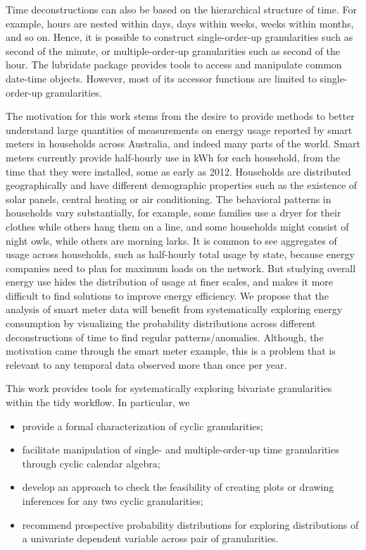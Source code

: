\documentclass[12pt]{article}
\providecommand{\tightlist}{%
  \setlength{\itemsep}{0pt}\setlength{\parskip}{0pt}}
\begin{document}
Time deconstructions can also be based on the hierarchical structure of time. For example, hours are nested within days, days within weeks, weeks within months, and so on. Hence, it is possible to construct single-order-up granularities such as second of the minute, or multiple-order-up granularities such as second of the hour. The lubridate package \citep{Grolemund2011-vm} provides tools to access and manipulate common date-time objects. However, most of its accessor functions are limited to single-order-up granularities.

The motivation for this work stems from the desire to provide methods to better understand large quantities of measurements on energy usage reported by smart meters in households across Australia, and indeed many parts of the world. Smart meters currently provide half-hourly use in kWh for each household, from the time that they were installed, some as early as 2012. Households are distributed geographically and have different demographic properties such as the existence of solar panels, central heating or air conditioning. The behavioral patterns in households vary substantially, for example, some families use a dryer for their clothes while others hang them on a line, and some households might consist of night owls, while others are morning larks. It is common to see aggregates \citep[see][]{Goodwin_2012} of usage across households, such as half-hourly total usage by state, because energy companies need to plan for maximum loads on the network. But studying overall energy use hides the distribution of usage at finer scales, and makes it more difficult to find solutions to improve energy efficiency. We propose that the analysis of smart meter data will benefit from systematically exploring energy consumption by visualizing the probability distributions across different deconstructions of time to find regular patterns/anomalies. Although, the motivation came through the smart meter example, this is a problem that is relevant to any temporal data observed more than once per year.

This work provides tools for systematically exploring bivariate granularities within the tidy workflow. In particular, we

\begin{itemize}
\tightlist
\item
  provide a formal characterization of cyclic granularities;
\item
  facilitate manipulation of single- and multiple-order-up time granularities through cyclic calendar algebra;
\item
  develop an approach to check the feasibility of creating plots or drawing inferences for any two cyclic granularities;
\item
  recommend prospective probability distributions for exploring distributions of a univariate dependent variable across pair of granularities.
\end{itemize}
\end{document}
